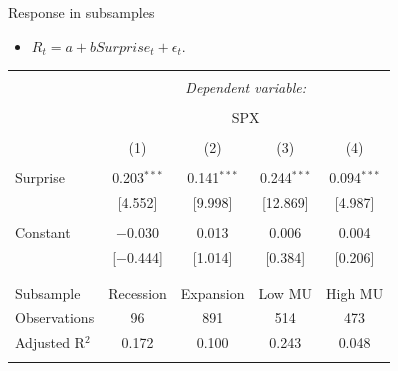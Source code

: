 \documentclass{beamer}
\begin{document}
\begin{frame}{Response in subsamples}
\begin{itemize}
    \item {$R_t = a + b Surprise_t + \epsilon_t.$}
\end{itemize}

\small
\begin{table}[!htbp] \centering 
  \label{} 
\begin{tabular}{@{\extracolsep{5pt}}lcccc} 
\\[-1.8ex]\hline 
\hline \\[-1.8ex] 
 & \multicolumn{4}{c}{\textit{Dependent variable:}} \\ 
\cline{2-5} 
\\[-1.8ex] & \multicolumn{4}{c}{SPX} \\ 
\\[-1.8ex] & (1) & (2) & (3) & (4)\\ 
\hline \\[-1.8ex] 
 Surprise & 0.203$^{***}$ & 0.141$^{***}$ & 0.244$^{***}$ & 0.094$^{***}$ \\ 
  & [4.552] & [9.998] & [12.869] & [4.987] \\ 
  & & & & \\ 
 Constant & $-$0.030 & 0.013 & 0.006 & 0.004 \\ 
  & [$-$0.444] & [1.014] & [0.384] & [0.206] \\ 
  & & & & \\ 
\hline \\[-1.8ex] 
Subsample & Recession & Expansion & Low MU & High MU \\ 
Observations & 96 & 891 & 514 & 473 \\ 
Adjusted R$^{2}$ & 0.172 & 0.100 & 0.243 & 0.048 \\ 
\hline 
\hline \\[-1.8ex] 
\end{tabular} 
\end{table} 
\end{frame}
\end{document}
